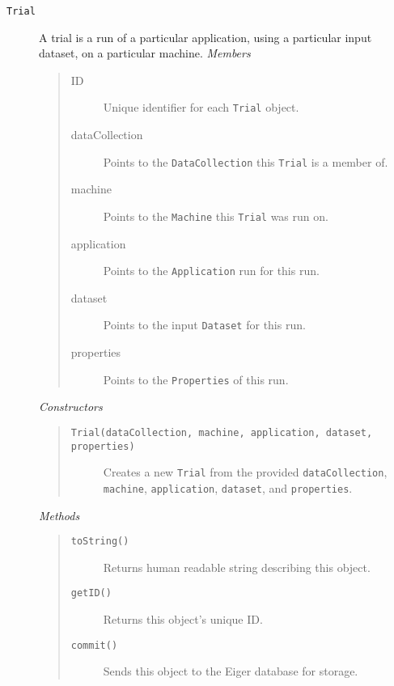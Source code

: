 \begin{description}
\item[\texttt{Trial}] A trial is a run of a particular application, using a particular input dataset, on a particular machine.
  {\em Members}
	\begin{quote}
	\begin{description}
    \item[ID] Unique identifier for each \texttt{Trial} object.
    \item[dataCollection] Points to the \texttt{DataCollection} this \texttt{Trial} is a member of.
    \item[machine] Points to the \texttt{Machine} this \texttt{Trial} was run on.
    \item[application] Points to the \texttt{Application} run for this run.
    \item[dataset] Points to the input \texttt{Dataset} for this run.
    \item[properties] Points to the \texttt{Properties} of this run.
	\end{description}
	\end{quote}
  {\em Constructors}
	\begin{quote}
	\begin{description}
    \item[\texttt{Trial(dataCollection, machine, application, dataset, properties)}] Creates a new \texttt{Trial} from the provided \texttt{dataCollection}, \texttt{machine}, \texttt{application}, \texttt{dataset}, and \texttt{properties}.
	\end{description}
	\end{quote}
	{\em Methods}
	\begin{quote}
	\begin{description}
		\item[\texttt{toString()}] Returns human readable string describing this object.
		\item[\texttt{getID()}] Returns this object's unique ID.
	\item[\texttt{commit()}] Sends this object to the Eiger database for storage.
	\end{description}
	\end{quote}


\end{description}
